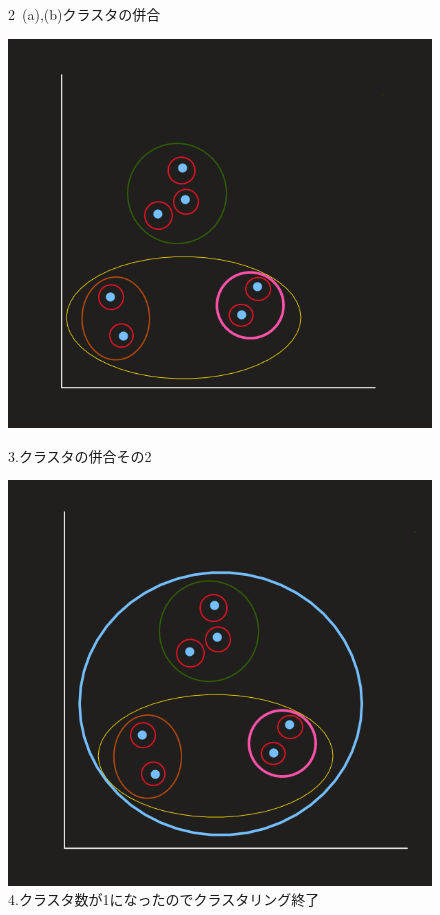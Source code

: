 \documentclass[dvipdfmx]{jsarticle}
\begin{document}
\begin{figure}[H]
\begin{minipage}{0.3\hsize}
\begin{center}
  \end{center}
  \caption{2~(a),(b)クラスタの併合}
  \label{fig:two}
 \end{minipage}
 \begin{minipage}{0.5\hsize}
  \begin{center}
   \includegraphics[scale=0.3]{images/gyousyu03.png}
  \end{center}
  \caption{3.クラスタの併合その2}
  \label{fig:two}
 \end{minipage}
 \begin{minipage}{0.5\hsize}
  \begin{center}
   \includegraphics[scale=0.3]{images/gyousyu04.png}
  \end{center}
  \caption{4.クラスタ数が1になったのでクラスタリング終了}
  \label{fig:two}
 \end{minipage}
\end{figure}
\end{document}
